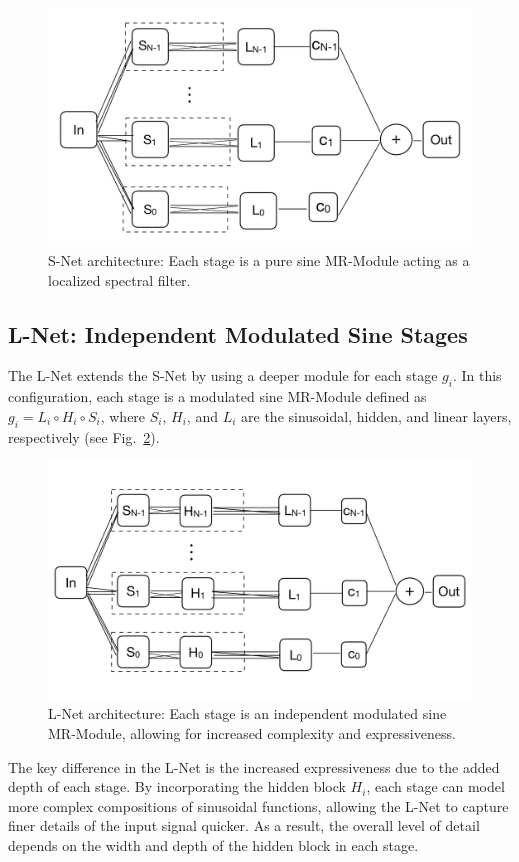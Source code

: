 \begin{figure}[!h]
\centering
\includegraphics[width=0.58\linewidth]{img/ch4/snet.pdf}
\caption{S-Net architecture: Each stage is a pure sine MR-Module acting as a localized spectral filter.}
\label{f:s-net}
\end{figure}

\subsection{L-Net: Independent Modulated Sine Stages}
\label{s-lnet}

The L-Net extends the S-Net by using a deeper module for each stage \( g_i \). In this configuration, each stage is a modulated sine MR-Module defined as \( g_i = L_i \circ H_i \circ S_i \), where \( S_i \), \( H_i \), and \( L_i \) are the sinusoidal, hidden, and linear layers, respectively (see Fig.~\ref{f:l-net}).

\begin{figure}[!h]
    \centering
    \includegraphics[width=0.7\linewidth]{img/ch4/lnet.pdf}
    \caption{L-Net architecture: Each stage is an independent modulated sine MR-Module, allowing for increased complexity and expressiveness.}
    \label{f:l-net}
\end{figure}

The key difference in the L-Net is the increased expressiveness due to the added depth of each stage. By incorporating the hidden block \( H_i \), each stage can model more complex compositions of sinusoidal functions, allowing the L-Net to capture finer details of the input signal quicker. As a result, the overall level of detail depends on the width and depth of the hidden block in each stage. 


